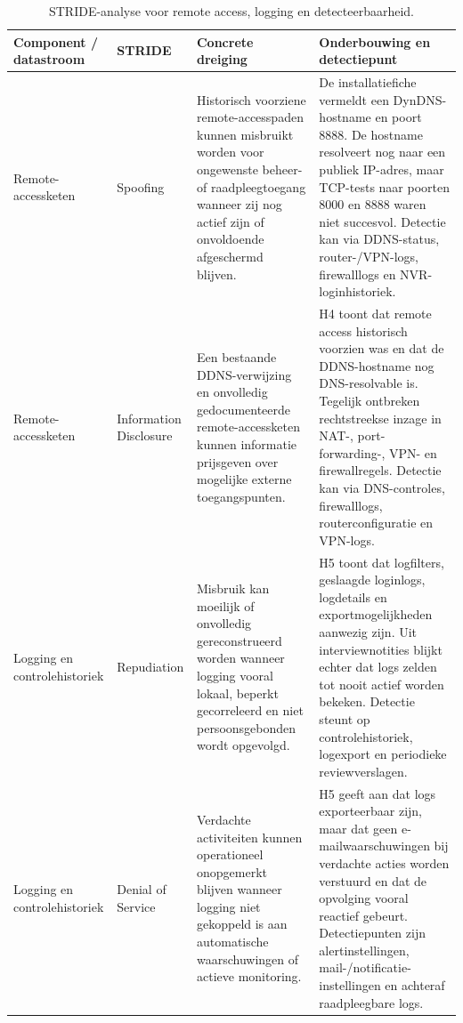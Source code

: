 \begin{table}[H]
    \centering
    \scriptsize
    \caption[STRIDE-analyse voor remote access en logging]{STRIDE-analyse voor remote access, logging en detecteerbaarheid.}
    \label{tab:app-stride-remote-logging}
    \begin{tabularx}{\textwidth}{p{}p{}X X}
        \hline
        \textbf{Component / datastroom} & \textbf{STRIDE} & \textbf{Concrete dreiging} & \textbf{Onderbouwing en detectiepunt} \\
        \hline
        Remote-accessketen &
        Spoofing &
        Historisch voorziene remote-accesspaden kunnen misbruikt worden voor ongewenste beheer- of raadpleegtoegang wanneer zij nog actief zijn of onvoldoende afgeschermd blijven. &
        De installatiefiche vermeldt een DynDNS-hostname en poort 8888. De hostname resolveert nog naar een publiek IP-adres, maar TCP-tests naar poorten 8000 en 8888 waren niet succesvol. Detectie kan via DDNS-status, router-/VPN-logs, firewalllogs en NVR-loginhistoriek. \\
        \hline
        Remote-accessketen &
        Information Disclosure &
        Een bestaande DDNS-verwijzing en onvolledig gedocumenteerde remote-accessketen kunnen informatie prijsgeven over mogelijke externe toegangspunten. &
        H4 toont dat remote access historisch voorzien was en dat de DDNS-hostname nog DNS-resolvable is. Tegelijk ontbreken rechtstreekse inzage in NAT-, port-forwarding-, VPN- en firewallregels. Detectie kan via DNS-controles, firewalllogs, routerconfiguratie en VPN-logs. \\
        \hline
        Logging en controlehistoriek &
        Repudiation &
        Misbruik kan moeilijk of onvolledig gereconstrueerd worden wanneer logging vooral lokaal, beperkt gecorreleerd en niet persoonsgebonden wordt opgevolgd. &
        H5 toont dat logfilters, geslaagde loginlogs, logdetails en exportmogelijkheden aanwezig zijn. Uit interviewnotities blijkt echter dat logs zelden tot nooit actief worden bekeken. Detectie steunt op controlehistoriek, logexport en periodieke reviewverslagen. \\
        \hline
        Logging en controlehistoriek &
        Denial of Service &
        Verdachte activiteiten kunnen operationeel onopgemerkt blijven wanneer logging niet gekoppeld is aan automatische waarschuwingen of actieve monitoring. &
        H5 geeft aan dat logs exporteerbaar zijn, maar dat geen e-mailwaarschuwingen bij verdachte acties worden verstuurd en dat de opvolging vooral reactief gebeurt. Detectiepunten zijn alertinstellingen, mail-/notificatie-instellingen en achteraf raadpleegbare logs. \\
        \hline
    \end{tabularx}
\end{table}

